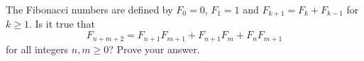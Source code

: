 The Fibonacci numbers are defined by $F_0=0$, $F_1=1$ and $F_{k+1}=F_k+F_{k-1}$ for $k\ge1$. Is it true that
\[F_{n+m+2}=F_{n+1}F_{m+1}+F_{n+1}F_m+F_nF_{m+1}\]
for all integers $n,m\ge0$? Prove your answer.
